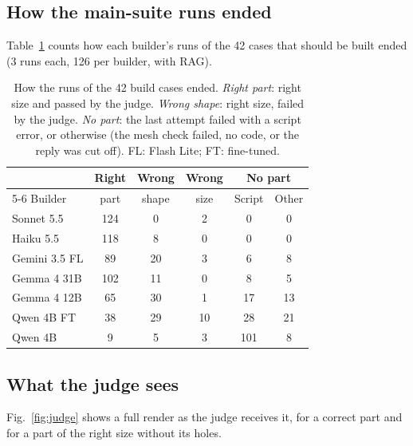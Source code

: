 \subsection{How the main-suite runs ended}
Table~\ref{tab:outcomes} counts how each builder's runs of the 42 cases that should be built ended (3 runs each, 126 per builder, with RAG).

\begin{table}[h]
  \centering
  \small
  \setlength{\tabcolsep}{3pt}
  \begin{tabular}{@{}lccccc@{}}
    \toprule
    & Right & Wrong & Wrong & \multicolumn{2}{c}{No part} \\
    \cmidrule(l){5-6}
    Builder & part & shape & size & Script & Other \\
    \midrule
    Sonnet 5.5     & 124 & 0  & 2  & 0   & 0  \\
    Haiku 5.5      & 118 & 8  & 0  & 0   & 0  \\
    Gemini 3.5 FL  & 89  & 20 & 3  & 6   & 8  \\
    Gemma 4 31B    & 102 & 11 & 0  & 8   & 5  \\
    Gemma 4 12B    & 65  & 30 & 1  & 17  & 13 \\
    Qwen 4B FT     & 38  & 29 & 10 & 28  & 21 \\
    Qwen 4B        & 9   & 5  & 3  & 101 & 8  \\
    \bottomrule
  \end{tabular}
  \caption{How the runs of the 42 build cases ended. \emph{Right part}: right size and passed by the judge.
    \emph{Wrong shape}: right size, failed by the judge. \emph{No part}: the last attempt failed with a script error,
    or otherwise (the mesh check failed, no code, or the reply was cut off). FL: Flash Lite; FT: fine-tuned.}
  \label{tab:outcomes}
\end{table}

\subsection{What the judge sees}
Fig.~\ref{fig:judge} shows a full render as the judge receives it, for a correct part and for a part of the right size without its holes.

